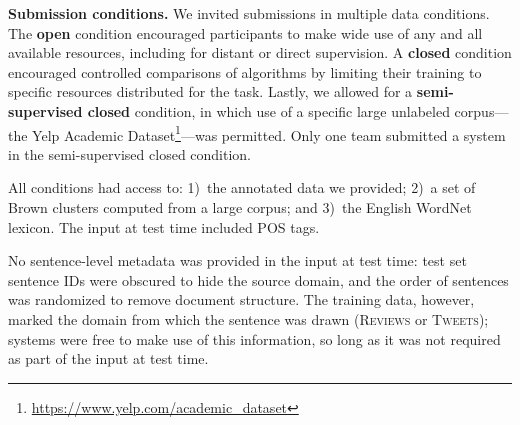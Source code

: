 \documentclass[11pt,letterpaper]{article}
\newcommand{\ensuretext}[1]{#1}
\newcommand{\nssmarker}{\ensuretext{\textcolor{magenta}{\ensuremath{^{\textsc{NS}}_{\textsc{S}}}}}}
\newcommand{\arkcomment}[3]{\ensuretext{\textcolor{#3}{[#1 #2]}}}
\newcommand{\nss}[1]{\arkcomment{\nssmarker}{#1}{magenta}}
\newcommand{\finalversion}[1]{}
\begin{document}
\textbf{Submission conditions.}
We invited submissions in multiple data conditions. %
The \textbf{open} condition encouraged participants to make 
wide use of any and all available resources, including for 
distant or direct supervision. 
A \textbf{closed} condition encouraged controlled comparisons of algorithms 
by limiting their training to specific resources distributed for the task. 
Lastly, we allowed for a \textbf{semi-supervised closed} condition, in which 
use of a specific large unlabeled corpus---the Yelp Academic Dataset\footnote{\url{https://www.yelp.com/academic_dataset}}---was permitted.
Only one team submitted a system in the semi-supervised closed condition.

All conditions had access to: 1)~the annotated data we provided; 
2)~a set of Brown clusters \citep{brown-92} computed from a large corpus;\finalversion{\nss{specify/cite}} 
and 3)~the English WordNet lexicon. 
The input at test time included POS tags. 

No sentence-level metadata was provided in the input at test time: 
test set sentence IDs were obscured to hide the source domain, and the order of sentences was randomized 
to remove document structure.
The training data, however, marked the domain from which the sentence was drawn 
(\textsc{Reviews} or \textsc{Tweets}); systems were free to make use of this information, 
so long as it was not required as part of the input at test time.
\end{document}
